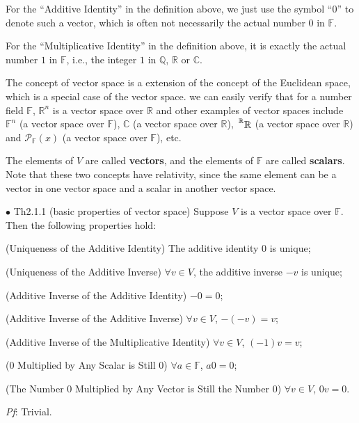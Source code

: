 \documentclass{article}
\begin{document}
\begin{Rmk}{}
    \begin{compactenum}
        \item For the ``Additive Identity'' in the definition above, we just use the symbol ``$0$'' to denote such a vector, which is often not necessarily the actual number $0$ in $\mathbb{F}$.
        \item For the ``Multiplicative Identity'' in the definition above, it is exactly the actual number $1$ in $\mathbb{F}$, i.e., the integer $1$ in $\mathbb{Q}$, $\mathbb{R}$ or $\mathbb{C}$.
        \item The concept of vector space is a extension of the concept of the Euclidean space, which is a special case of the vector space. we can easily verify that \textcolor{Th}{for a number field $\mathbb{F}$, $\mathbb{R}^n$ is a vector space over $\mathbb{R}$ and other examples of vector spaces include $\mathbb{F}^n$ (a vector space over $\mathbb{F}$), $\mathbb{C}$ (a vector space over $\mathbb{R}$), $\sideset{^\mathbb{R}}{}{\mathop{\mathbb{R}}}$ (a vector space over $\mathbb{R}$) and $\mathcal{P}_\mathbb{F}(x)$ (a vector space over $\mathbb{F}$), etc.}
        \item The elements of $V$ are called \textbf{vectors}, and the elements of $\mathbb{F}$ are called \textbf{scalars}. Note that these two concepts have relativity, since the same element can be a vector in one vector space and a scalar in another vector space.
    \end{compactenum}
\end{Rmk}

\begin{Th}{$\bullet$ Th2.1.1 (basic properties of vector space)}
    Suppose $V$ is a vector space over $\mathbb{F}$. Then the following properties hold:
    \begin{compactenum}
        \item (Uniqueness of the Additive Identity) The additive identity $0$ is unique;
        \item (Uniqueness of the Additive Inverse) $\forall v\in V$, the additive inverse $-v$ is unique;
        \item (Additive Inverse of the Additive Identity) $-0=0$;
        \item (Additive Inverse of the Additive Inverse) $\forall v\in V$, $-(-v)=v$;
        \item (Additive Inverse of the Multiplicative Identity) $\forall v\in V$, $(-1)v=v$;
        \item ($0$ Multiplied by Any Scalar is Still $0$) $\forall a\in \mathbb{F}$, $a0=0$;
        \item (The Number $0$ Multiplied by Any Vector is Still the Number $0$) $\forall v\in V$, $0v=0$.
    \end{compactenum}
    \tcblower
    \textit{Pf}: Trivial.
\end{Th}
\end{document}
